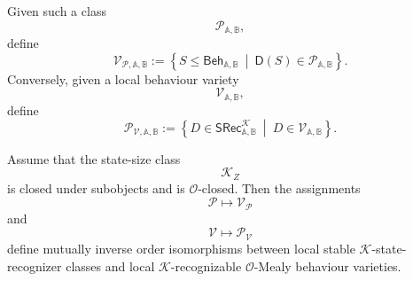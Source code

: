Given such a class
\[
\mathcal P_{\mathbb A,\mathbb B},
\]
define
\[
\mathcal V_{\mathcal P,\mathbb A,\mathbb B}
:=
\left\{
S\leq\mathsf{Beh}_{\mathbb A,\mathbb B}
\ \middle|\
\mathsf D(S)\in\mathcal P_{\mathbb A,\mathbb B}
\right\}.
\]
Conversely, given a local behaviour variety
\[
\mathcal V_{\mathbb A,\mathbb B},
\]
define
\[
\mathcal P_{\mathcal V,\mathbb A,\mathbb B}
:=
\left\{
D\in\mathsf{SRec}^{\mathcal K}_{\mathbb A,\mathbb B}
\ \middle|\
D\in\mathcal V_{\mathbb A,\mathbb B}
\right\}.
\]

\begin{theorem}
\label{thm:eilenberg-state-correspondence}
Assume that the state-size class
\[
\mathcal K_Z
\]
is closed under subobjects and is \(\mathcal O\)-closed. Then the assignments
\[
\mathcal P\longmapsto\mathcal V_{\mathcal P}
\]
and
\[
\mathcal V\longmapsto\mathcal P_{\mathcal V}
\]
define mutually inverse order isomorphisms between local stable
\(\mathcal K\)-state-recognizer classes and local
\(\mathcal K\)-recognizable \(\mathcal O\)-Mealy behaviour varieties.
\end{theorem}

